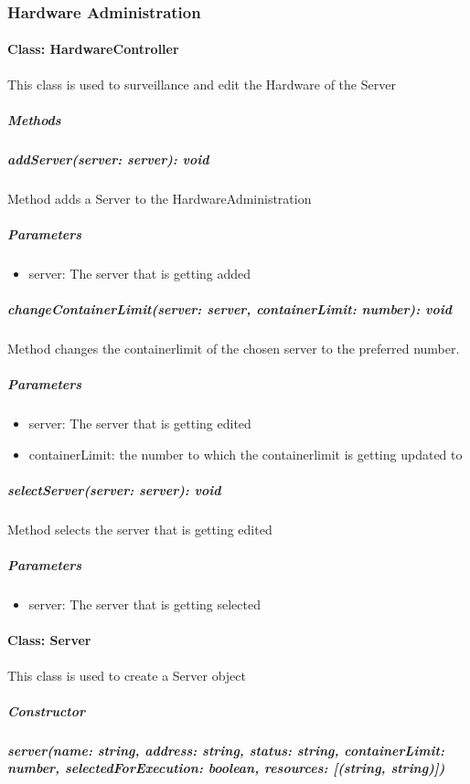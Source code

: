 \subsubsection{Hardware Administration}


\paragraph{Class: HardwareController}
This class is used to surveillance and edit the Hardware of the Server

\subparagraph{Methods}

\subparagraph{addServer(server: server): void}

Method adds a Server to the HardwareAdministration

\subparagraph{Parameters}
\begin{itemize}
	\item{server:}
	The server that is getting added
\end{itemize}


\subparagraph{changeContainerLimit(server: server, containerLimit: number): void}

Method changes the containerlimit of the chosen server to the preferred number.

\subparagraph{Parameters}
\begin{itemize}
	\item{server:}
	The server that is getting edited
	\item{containerLimit:}
	the number to which the containerlimit is getting updated to
\end{itemize}


\subparagraph{selectServer(server: server): void}

Method selects the server that is getting edited

\subparagraph{Parameters}
\begin{itemize}
	\item{server:}
	The server that is getting selected
\end{itemize}




\paragraph{Class: Server}
This class is used to create a Server object

\subparagraph{Constructor}

\subparagraph{server(name: string, address: string, status: string, containerLimit: number, selectedForExecution: boolean, resources: [(string, string)])}

